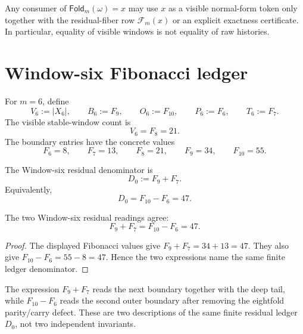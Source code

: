 \begin{principle}
\label{prin:zeckendorf-fold-readout-fiber}
Any consumer of \(\mathsf{Fold}_m(\omega)=x\) may use \(x\) as a visible
normal-form token only together with the residual-fiber row
\(\mathcal{F}_m(x)\) or an explicit exactness certificate. In
particular, equality of visible windows is not equality of raw histories.
\end{principle}

\section{Window-six Fibonacci ledger}

\begin{definition}
\label{def:zeckendorf-window-six-ledger-coordinates}
For \(m=6\), define
$$
  V_6:=|X_6|,\qquad
  B_6:=F_9,\qquad
  O_6:=F_{10},\qquad
  P_6:=F_6,\qquad
  T_6:=F_7.
$$
The visible stable-window count is
$$
  V_6=F_8=21.
$$
The boundary entries have the concrete values
$$
  F_6=8,\qquad
  F_7=13,\qquad
  F_8=21,\qquad
  F_9=34,\qquad
  F_{10}=55.
$$
\end{definition}

\begin{definition}
\label{def:zeckendorf-window-six-residual-denominator}
The Window-six residual denominator is
$$
  D_0:=F_9+F_7.
$$
Equivalently,
$$
  D_0=F_{10}-F_6=47.
$$
\end{definition}

\begin{theorem}
\label{thm:zeckendorf-window-six-residual-denominator}
The two Window-six residual readings agree:
$$
  F_9+F_7=F_{10}-F_6=47.
$$
\end{theorem}
\begin{proof}
The displayed Fibonacci values give \(F_9+F_7=34+13=47\). They also
give \(F_{10}-F_6=55-8=47\). Hence the two expressions name the same
finite ledger denominator.
\end{proof}

\begin{corollary}
\label{cor:zeckendorf-window-six-boundary-tail-ledger}
The expression \(F_9+F_7\) reads the next boundary together with the
deep tail, while \(F_{10}-F_6\) reads the second outer boundary after
removing the eightfold parity/carry defect. These are two descriptions
of the same finite residual ledger \(D_0\), not two independent
invariants.
\end{corollary}

